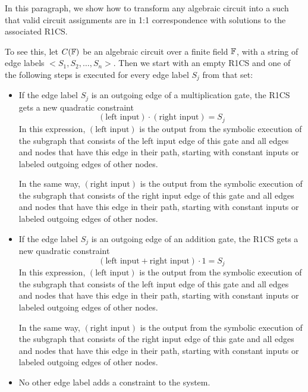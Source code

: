 In this paragraph, we show how to transform any algebraic circuit into a  such that valid circuit assignments are in 1:1 correspondence with solutions to the associated R1CS. 

To see this, let $C(\mathbb{F})$ be an algebraic circuit over a finite field $\mathbb{F}$, with a string of edge labels $<S_1,S_2,\ldots, S_n>$. Then we start with an empty R1CS and one of the following steps is executed for every edge label $S_j$ from that set:
\begin{itemize}
\label{algebraic-gates}
\item If the edge label $S_j$ is an outgoing edge of a multiplication gate, the R1CS gets a new quadratic constraint
\begin{equation}
(\text{left input})\cdot (\text{right input}) = S_j
\end{equation} 
In this expression, $(\text{left input})$ is the output from the symbolic execution of the subgraph that consists of the left input edge of this gate and all edges and nodes that have  this edge in their path, starting with constant inputs or labeled outgoing edges of other nodes. 

In the same way, $(\text{right input})$ is the output from the symbolic execution of the subgraph that consists of the right input edge of this gate and all edges and nodes that have this edge in their path, starting with constant inputs or labeled outgoing edges of other nodes.
\item If the edge label $S_j$ is an outgoing edge of an addition gate, the R1CS gets a new quadratic constraint
\begin{equation}
(\text{left input} + \text{right input})\cdot 1 = S_j
\end{equation}  
In this expression, $(\text{left input})$ is the output from the symbolic execution of the subgraph that consists of the left input edge of this gate and all edges and nodes that have  this edge in their path, starting with constant inputs or labeled outgoing edges of other nodes. 

In the same way, $(\text{right input})$ is the output from the symbolic execution of the subgraph that consists of the right input edge of this gate and all edges and nodes that have this edge in their path, starting with constant inputs or labeled outgoing edges of other nodes.
\item No other edge label adds a constraint to the system.
\end{itemize}

